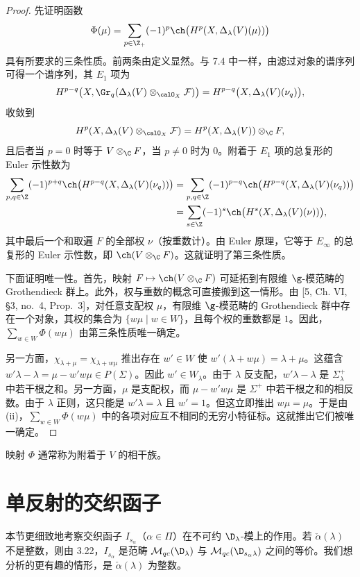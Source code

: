 \begin{proof}
先证明函数
$$\Phi(\mu)=\sum_{p\in\Z_+}(-1)^p\ch\bigl(H^p(X,\Delta_\lambda(V)(\mu))\bigr)$$
具有所要求的三条性质。前两条由定义显然。与 7.4 中一样，由滤过对象的谱序列可得一个谱序列，其 $E_1$ 项为
$$H^{p-q}\bigl(X,\Gr_q(\Delta_\lambda(V)\otimes_{\calO_X}\mathcal{F})\bigr)=H^{p-q}\bigl(X,\Delta_\lambda(V)(\nu_q)\bigr),$$
收敛到
$$H^p(X,\Delta_\lambda(V)\otimes_{\calO_X}\mathcal{F})=H^p(X,\Delta_\lambda(V))\otimes_\C F,$$
且后者当 $p=0$ 时等于 $V\otimes_\C F$，当 $p\ne0$ 时为 $0$。附着于 $E_1$ 项的总复形的 Euler 示性数为
\begin{align*}
\sum_{p,q\in\Z}(-1)^{p+q}\ch\bigl(H^{p-q}(X,\Delta_\lambda(V)(\nu_q))\bigr)
&=\sum_{p,q\in\Z}(-1)^{p-q}\ch\bigl(H^{p-q}(X,\Delta_\lambda(V)(\nu_q))\bigr)\\
&=\sum_{s\in\Z}(-1)^s\ch\bigl(H^s(X,\Delta_\lambda(V)(\nu))\bigr),
\end{align*}
其中最后一个和取遍 $F$ 的全部权 $\nu$（按重数计）。由 Euler 原理，它等于 $E_\infty$ 的总复形的 Euler 示性数，即 $\ch(V\otimes_\C F)$。这就证明了第三条性质。

下面证明唯一性。首先，映射 $F\mapsto\ch(V\otimes_\C F)$ 可延拓到有限维 $\g$-模范畴的 Grothendieck 群上。此外，权与重数的概念可直接搬到这一情形。由 [5, Ch. VI, \S3, no.~4, Prop.~3]，对任意支配权 $\mu$，有限维 $\g$-模范畴的 Grothendieck 群中存在一个对象，其权的集合为 $\{w\mu\mid w\in W\}$，且每个权的重数都是 $1$。因此，$\sum_{w\in W}\Phi(w\mu)$ 由第三条性质唯一确定。

另一方面，$\chi_{\lambda+\mu}=\chi_{\lambda+w\mu}$ 推出存在 $w'\in W$ 使 $w'(\lambda+w\mu)=\lambda+\mu$。这蕴含 $w'\lambda-\lambda=\mu-w'w\mu\in P(\Sigma)$。因此 $w'\in W_\lambda$。由于 $\lambda$ 反支配，$w'\lambda-\lambda$ 是 $\Sigma^+_\lambda$ 中若干根之和。另一方面，$\mu$ 是支配权，而 $\mu-w'w\mu$ 是 $\Sigma^+$ 中若干根之和的相反数。由于 $\lambda$ 正则，这只能是 $w'\lambda=\lambda$ 且 $w'=1$。但这立即推出 $w\mu=\mu$。于是由 (ii)，$\sum_{w\in W}\Phi(w\mu)$ 中的各项对应互不相同的无穷小特征标。这就推出它们被唯一确定。
\end{proof}

映射 $\Phi$ 通常称为附着于 $V$ 的相干族。

\section{单反射的交织函子}
\label{sec:03.3.8}

本节更细致地考察交织函子 $I_{s_\alpha}$（$\alpha\in\Pi$）在不可约 $\D_\lambda$-模上的作用。若 $\check\alpha(\lambda)$ 不是整数，则由 3.22，$I_{s_\alpha}$ 是范畴 $\mathcal{M}_{qc}(\D_\lambda)$ 与 $\mathcal{M}_{qc}(\D_{s_\alpha\lambda})$ 之间的等价。我们想分析的更有趣的情形，是 $\check\alpha(\lambda)$ 为整数。

